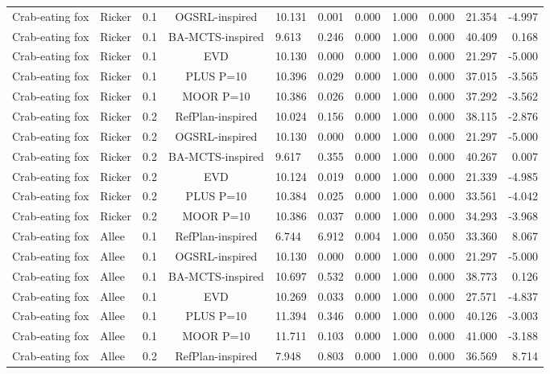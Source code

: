 \documentclass[10pt]{article}
\begin{document}
\begin{landscape}
\begin{center}
\begin{longtable}{@{}lllclrrrrrr@{}}
Crab-eating fox & Ricker & 0.1 & OGSRL-inspired & 10.131 & 0.001 & 0.000 & 1.000 & 0.000 & 21.354 & -4.997 \\
Crab-eating fox & Ricker & 0.1 & BA-MCTS-inspired & 9.613 & 0.246 & 0.000 & 1.000 & 0.000 & 40.409 & 0.168 \\
Crab-eating fox & Ricker & 0.1 & EVD & 10.130 & 0.000 & 0.000 & 1.000 & 0.000 & 21.297 & -5.000 \\
Crab-eating fox & Ricker & 0.1 & PLUS P=10 & 10.396 & 0.029 & 0.000 & 1.000 & 0.000 & 37.015 & -3.565 \\
Crab-eating fox & Ricker & 0.1 & MOOR P=10 & 10.386 & 0.026 & 0.000 & 1.000 & 0.000 & 37.292 & -3.562 \\
Crab-eating fox & Ricker & 0.2 & RefPlan-inspired & 10.024 & 0.156 & 0.000 & 1.000 & 0.000 & 38.115 & -2.876 \\
Crab-eating fox & Ricker & 0.2 & OGSRL-inspired & 10.130 & 0.000 & 0.000 & 1.000 & 0.000 & 21.297 & -5.000 \\
Crab-eating fox & Ricker & 0.2 & BA-MCTS-inspired & 9.617 & 0.355 & 0.000 & 1.000 & 0.000 & 40.267 & 0.007 \\
Crab-eating fox & Ricker & 0.2 & EVD & 10.124 & 0.019 & 0.000 & 1.000 & 0.000 & 21.339 & -4.985 \\
Crab-eating fox & Ricker & 0.2 & PLUS P=10 & 10.384 & 0.025 & 0.000 & 1.000 & 0.000 & 33.561 & -4.042 \\
Crab-eating fox & Ricker & 0.2 & MOOR P=10 & 10.386 & 0.037 & 0.000 & 1.000 & 0.000 & 34.293 & -3.968 \\
Crab-eating fox & Allee & 0.1 & RefPlan-inspired & 6.744 & 6.912 & 0.004 & 1.000 & 0.050 & 33.360 & 8.067 \\
Crab-eating fox & Allee & 0.1 & OGSRL-inspired & 10.130 & 0.000 & 0.000 & 1.000 & 0.000 & 21.297 & -5.000 \\
Crab-eating fox & Allee & 0.1 & BA-MCTS-inspired & 10.697 & 0.532 & 0.000 & 1.000 & 0.000 & 38.773 & 0.126 \\
Crab-eating fox & Allee & 0.1 & EVD & 10.269 & 0.033 & 0.000 & 1.000 & 0.000 & 27.571 & -4.837 \\
Crab-eating fox & Allee & 0.1 & PLUS P=10 & 11.394 & 0.346 & 0.000 & 1.000 & 0.000 & 40.126 & -3.003 \\
Crab-eating fox & Allee & 0.1 & MOOR P=10 & 11.711 & 0.103 & 0.000 & 1.000 & 0.000 & 41.000 & -3.188 \\
Crab-eating fox & Allee & 0.2 & RefPlan-inspired & 7.948 & 0.803 & 0.000 & 1.000 & 0.000 & 36.569 & 8.714 \\

\end{longtable}
\end{center}
\end{landscape}
\end{document}
